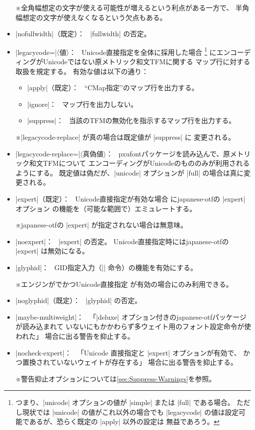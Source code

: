 \documentclass[uplatex,dvipdfmx,a4paper]{jsarticle}
\newcommand{\Pkg}[1]{\textsf{#1}}
\newcommand{\Meta}[1]{$\langle$\mbox{}#1\mbox{}$\rangle$}
\newcommand{\Note}{\par\noindent ※}
\newcommand{\Means}{：\ }
\begin{document}
\begin{itemize}
  \Note 全角幅想定の文字が使える可能性が増えるという利点がある一方で、
  半角幅想定の文字が使えなくなるという欠点もある。
\item |nofullwidth|（既定）\Means
  |fullwidth| の否定。
\item |legacycode=|\Meta{値}\Means
  Unicode直接指定を全体に採用した場合
  \footnote{つまり、|unicode| オプションの値が |simple|
    または |full| である場合。
    ただし現状では |unicode| の値がこれ以外の場合でも |legacycode|
    の値は設定可能であるが、恐らく既定の |apply| 以外の設定は
    無益であろう。}%
  にエンコーディングがUnicodeではない原メトリック和文TFMに関する
  マップ行に対する取扱を規定する。
  有効な値は以下の通り\Means
  \begin{itemize}
  \item |apply|（既定）\Means
    “CMap指定”のマップ行を出力する。
  \item |ignore|\Means
    マップ行を出力しない。
  \item |suppress|\Means
    当該のTFMの無効化を指示するマップ行を出力する。
  \end{itemize}
  \Note |legacycode-replace| が真の場合は既定値が |suppress| に
  変更される。
\item |legacycode-replace=|\Meta{真偽値}\Means
  \Pkg{pxufont}パッケージを読み込んで、原メトリック和文TFMについて
  エンコーディングがUnicodeのもののみが利用されるようにする。
  既定値は偽だが、|unicode| オプションが |full| の場合は真に変更される。
\item |expert|（既定）\Means
  Unicode直接指定が有効な場合
  に\Pkg{japanese-otf}の |expert| オプション
  の機能を（可能な範囲で）エミュレートする。
  \Note \Pkg{japanese-otf}の |expert| が指定されない場合は無意味。
\item |noexpert|\Means
  |expert| の否定。
  Unicode直接指定時には\Pkg{japanese-otf}の |expert| は無効になる。
\item |glyphid|\Means
  GID指定入力（|\gid| 命令）の機能を有効にする。
  \Note エンジンが{\upLaTeX}でかつUnicode直接指定
  が有効の場合にのみ利用できる。
\item |noglyphid|（既定）\Means
  |glyphid| の否定。
\item |maybe-multiweight|\Means
  「|deluxe| オプション付きの\Pkg{japanese-otf}パッケージが読み込まれて
  いないにもかかわらず多ウェイト用のフォント設定命令が使われた」
  場合に出る警告を抑止する。
\item |nocheck-expert|\Means
  「Unicode 直接指定と |expert| オプションが有効で、
  かつ置換されていないウェイトが存在する」
  場合に出る警告を抑止する。
  \Note 警告抑止オプションについては\ref{sec:Suppress-Warnings}を参照。
\end{itemize}
\end{document}
